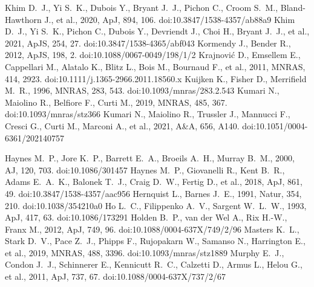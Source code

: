 \documentclass[fleqn,usenatbib]{mnras}
\begin{document}
\begin{thebibliography}{}
 Khim D.~J., Yi S.~K., Dubois Y., Bryant J.~J., Pichon C., Croom S.~M., Bland-Hawthorn J., et al., 2020, ApJ, 894, 106. doi:10.3847/1538-4357/ab88a9
 Khim D.~J., Yi S.~K., Pichon C., Dubois Y., Devriendt J., Choi H., Bryant J.~J., et al., 2021, ApJS, 254, 27. doi:10.3847/1538-4365/abf043
 Kormendy J., Bender R., 2012, ApJS, 198, 2. doi:10.1088/0067-0049/198/1/2
 Krajnovi{\'c} D., Emsellem E., Cappellari M., Alatalo K., Blitz L., Bois M., Bournaud F., et al., 2011, MNRAS, 414, 2923. doi:10.1111/j.1365-2966.2011.18560.x
 Kuijken K., Fisher D., Merrifield M.~R., 1996, MNRAS, 283, 543. doi:10.1093/mnras/283.2.543
 Kumari N., Maiolino R., Belfiore F., Curti M., 2019, MNRAS, 485, 367. doi:10.1093/mnras/stz366
 Kumari N., Maiolino R., Trussler J., Mannucci F., Cresci G., Curti M., Marconi A., et al., 2021, A\&A, 656, A140. doi:10.1051/0004-6361/202140757

 Haynes M.~P., Jore K.~P., Barrett E.~A., Broeils A.~H., Murray B.~M., 2000, AJ, 120, 703. doi:10.1086/301457
 Haynes M.~P., Giovanelli R., Kent B.~R., Adams E.~A.~K., Balonek T.~J., Craig D.~W., Fertig D., et al., 2018, ApJ, 861, 49. doi:10.3847/1538-4357/aac956
 Hernquist L., Barnes J.~E., 1991, Natur, 354, 210. doi:10.1038/354210a0
 Ho L.~C., Filippenko A.~V., Sargent W.~L.~W., 1993, ApJ, 417, 63. doi:10.1086/173291
 Holden B.~P., van der Wel A., Rix H.-W., Franx M., 2012, ApJ, 749, 96. doi:10.1088/0004-637X/749/2/96
 Masters K.~L., Stark D.~V., Pace Z.~J., Phipps F., Rujopakarn W., Samanso N., Harrington E., et al., 2019, MNRAS, 488, 3396. doi:10.1093/mnras/stz1889
 Murphy E.~J., Condon J.~J., Schinnerer E., Kennicutt R.~C., Calzetti D., Armus L., Helou G., et al., 2011, ApJ, 737, 67. doi:10.1088/0004-637X/737/2/67


\end{thebibliography}
\end{document}
